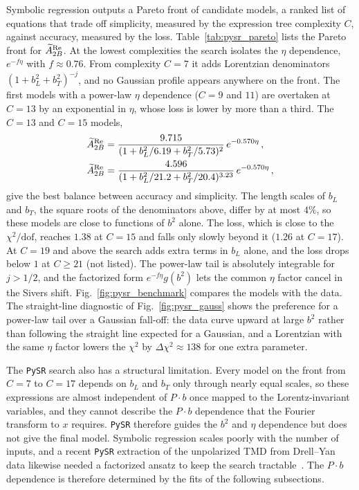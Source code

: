 Symbolic regression outputs a Pareto front of candidate models, a ranked list of equations that trade off simplicity, measured by the expression tree complexity $C$, against accuracy, measured by the loss. Table~\ref{tab:pysr_pareto} lists the Pareto front for $\widetilde{A}_{2B}^{\text{Re}}$. At the lowest complexities the search isolates the $\eta$ dependence, $e^{-f\eta}$ with $f\approx0.76$. From complexity $C=7$ it adds Lorentzian denominators $(1+b_L^2+b_T^2)^{-j}$, and no Gaussian profile appears anywhere on the front. The first models with a power-law $\eta$ dependence ($C=9$ and $11$) are overtaken at $C=13$ by an exponential in $\eta$, whose loss is lower by more than a third. The $C=13$ and $C=15$ models,
\begin{align}
\widetilde{A}_{2B}^{\text{Re}}&=\frac{9.715}{(1+b_L^2/6.19+b_T^2/5.73)^{2}}\,e^{-0.570\eta}\,,\\
\widetilde{A}_{2B}^{\text{Re}}&=\frac{4.596}{(1+b_L^2/21.2+b_T^2/20.4)^{3.23}}\,e^{-0.570\eta}\,,
\end{align}
give the best balance between accuracy and simplicity. The length scales of $b_L$ and $b_T$, the square roots of the denominators above, differ by at most $4\%$, so these models are close to functions of $b^2$ alone. The loss, which is close to the $\chi^2/\text{dof}$, reaches $1.38$ at $C=15$ and falls only slowly beyond it ($1.26$ at $C=17$). At $C=19$ and above the search adds extra terms in $b_L$ alone, and the loss drops below $1$ at $C\ge21$ (not listed). The power-law tail is absolutely integrable for $j>1/2$, and the factorized form $e^{-f\eta}g(b^2)$ lets the common $\eta$ factor cancel in the Sivers shift. Fig.~\ref{fig:pysr_benchmark} compares the models with the data. The straight-line diagnostic of Fig.~\ref{fig:pysr_gauss} shows the preference for a power-law tail over a Gaussian fall-off: the data curve upward at large $b^2$ rather than following the straight line expected for a Gaussian, and a Lorentzian with the same $\eta$ factor lowers the $\chi^2$ by $\Delta\chi^2\approx138$ for one extra parameter.

The \texttt{PySR} search also has a structural limitation. Every model on the front from $C=7$ to $C=17$ depends on $b_L$ and $b_T$ only through nearly equal scales, so these expressions are almost independent of $P\cdot b$ once mapped to the Lorentz-invariant variables, and they cannot describe the $P\cdot b$ dependence that the Fourier transform to $x$ requires. \texttt{PySR} therefore guides the $b^2$ and $\eta$ dependence but does not give the final model. Symbolic regression scales poorly with the number of inputs, and a recent \texttt{PySR} extraction of the unpolarized TMD from Drell--Yan data likewise needed a factorized ansatz to keep the search tractable~\cite{Granger:2026symb}. The $P\cdot b$ dependence is therefore determined by the fits of the following subsections.

